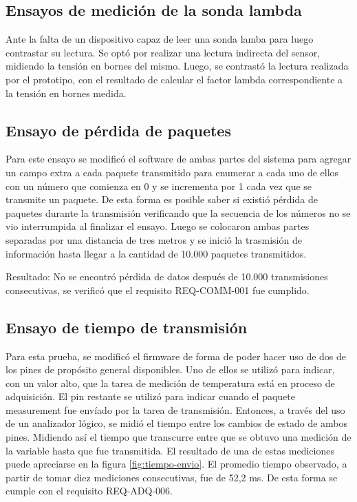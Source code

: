 \subsection{Ensayos de medición de la sonda lambda}

Ante la falta de un dispositivo capaz de leer una sonda lamba para luego contrastar su lectura. Se optó por realizar una lectura indirecta del sensor, midiendo la tensión en bornes del mismo. Luego, se contrastó la lectura realizada por el prototipo, con el resultado de calcular el factor lambda correspondiente a la tensión en bornes medida.

\subsection{Ensayo de pérdida de paquetes}

Para este ensayo se modificó el software de ambas partes del sistema para agregar un campo extra a cada paquete transmitido para enumerar a cada uno de ellos con un número que comienza en 0 y se incrementa por 1 cada vez que se transmite un paquete. De esta forma es posible saber si existió pérdida de paquetes durante la transmisión verificando que la secuencia de los números no se vio interrumpida al finalizar el ensayo. Luego se colocaron ambas partes separadas por una distancia de tres metros y se inició la trasmisión de información hasta llegar a la cantidad de 10.000 paquetes transmitidos. 

Resultado: No se encontró pérdida de datos después de 10.000 transmisiones consecutivas, se verificó que el requisito REQ-COMM-001 fue cumplido.

\subsection{Ensayo de tiempo de transmisión}

Para esta prueba, se modificó el firmware de forma de poder hacer uso de dos de los pines de propósito general disponibles. Uno de ellos se utilizó para indicar, con un valor alto, que la tarea de medición de temperatura está en proceso de adquisición. El pin restante se utilizó para indicar cuando el paquete measurement fue envíado por la tarea de transmisión. Entonces, a través del uso de un analizador lógico, se midió el tiempo entre los cambios de estado de ambos pines. Midiendo así el tiempo que transcurre entre que se obtuvo una medición de la variable hasta que fue transmitida. El resultado de una de estas mediciones puede apreciarse en la figura \ref{fig:tiempo-envio}. El promedio tiempo observado, a partir de tomar diez mediciones consecutivas, fue de 52,2 ms. De esta forma se cumple con el requisito REQ-ADQ-006.

